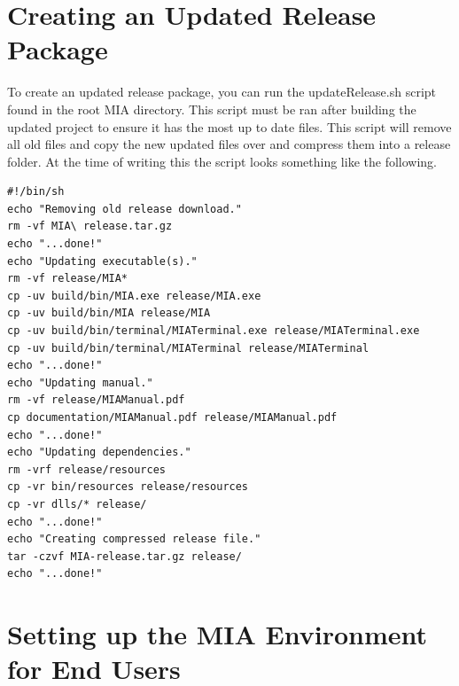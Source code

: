 \section{Creating an Updated Release Package}

To create an updated release package, you can run the updateRelease.sh script found in the root MIA directory. This script must be ran after building the updated project to ensure it has the most up to date files. This script will remove all old files and copy the new updated files over and compress them into a release folder. At the time of writing this the script looks something like the following.

\begin{lstlisting}
#!/bin/sh
echo "Removing old release download."
rm -vf MIA\ release.tar.gz
echo "...done!"
echo "Updating executable(s)."
rm -vf release/MIA*
cp -uv build/bin/MIA.exe release/MIA.exe
cp -uv build/bin/MIA release/MIA
cp -uv build/bin/terminal/MIATerminal.exe release/MIATerminal.exe
cp -uv build/bin/terminal/MIATerminal release/MIATerminal
echo "...done!"
echo "Updating manual."
rm -vf release/MIAManual.pdf
cp documentation/MIAManual.pdf release/MIAManual.pdf
echo "...done!"
echo "Updating dependencies."
rm -vrf release/resources
cp -vr bin/resources release/resources
cp -vr dlls/* release/
echo "...done!"
echo "Creating compressed release file."
tar -czvf MIA-release.tar.gz release/
echo "...done!"
\end{lstlisting}

\section{Setting up the MIA Environment for End Users}

